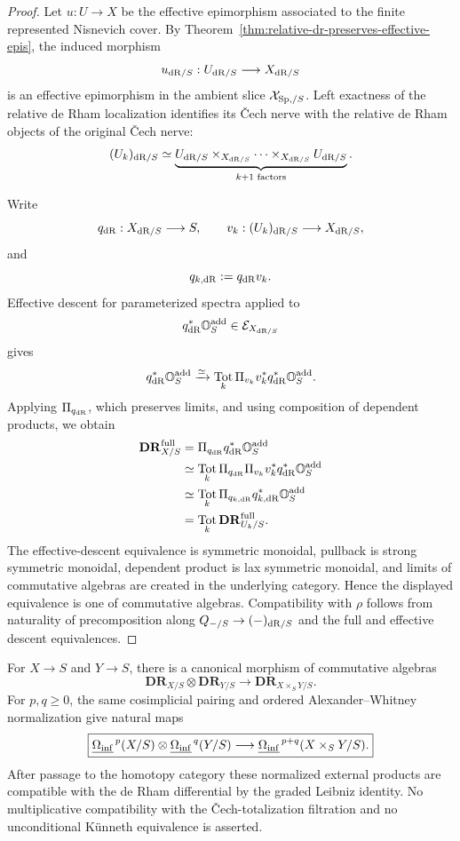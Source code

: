 \begin{proof}
Let \(u:U\to X\) be the effective epimorphism associated to the finite represented Nisnevich cover.
By Theorem~\ref{thm:relative-dr-preserves-effective-epis}, the induced morphism
\[
    u_{\mathrm{dR}/S}:
    U_{\mathrm{dR}/S}
    \longrightarrow
    X_{\mathrm{dR}/S}
\]
is an effective epimorphism in the ambient slice \(\mathcal X_{\mathrm{Sp},/S}\).  Left exactness of the
relative de Rham localization identifies its \v{C}ech nerve with the relative de Rham objects of
the original \v{C}ech nerve:
\[
    (U_k)_{\mathrm{dR}/S}
    \simeq
    \underbrace{
        U_{\mathrm{dR}/S}\times_{X_{\mathrm{dR}/S}}\cdots\times_{X_{\mathrm{dR}/S}}U_{\mathrm{dR}/S}
    }_{k+1\text{ factors}}.
\]

Write
\[
    q_{\mathrm{dR}}:X_{\mathrm{dR}/S}\longrightarrow S,
    \qquad
    v_k:(U_k)_{\mathrm{dR}/S}\longrightarrow X_{\mathrm{dR}/S},
\]
and
\[
    q_{k,\mathrm{dR}}:=q_{\mathrm{dR}}v_k.
\]
Effective descent for parameterized spectra applied to
\[
    q_{\mathrm{dR}}^*\mathbb O_S^{\mathrm{add}}
    \in
    \mathcal E_{X_{\mathrm{dR}/S}}
\]
gives
\[
    q_{\mathrm{dR}}^*\mathbb O_S^{\mathrm{add}}
    \xrightarrow{\simeq}
    \operatorname*{Tot}_k
    \Pi_{v_k}v_k^*q_{\mathrm{dR}}^*\mathbb O_S^{\mathrm{add}}.
\]
Applying \(\Pi_{q_{\mathrm{dR}}}\), which preserves limits, and using composition of dependent products,
we obtain
\[
\begin{aligned}
    \mathbf{DR}^{\mathrm{full}}_{X/S}
    &=
    \Pi_{q_{\mathrm{dR}}}q_{\mathrm{dR}}^*\mathbb O_S^{\mathrm{add}}
    \\
    &\simeq
    \operatorname*{Tot}_k
    \Pi_{q_{\mathrm{dR}}}\Pi_{v_k}v_k^*q_{\mathrm{dR}}^*\mathbb O_S^{\mathrm{add}}
    \\
    &\simeq
    \operatorname*{Tot}_k
    \Pi_{q_{k,\mathrm{dR}}}q_{k,\mathrm{dR}}^*\mathbb O_S^{\mathrm{add}}
    \\
    &=
    \operatorname*{Tot}_k
    \mathbf{DR}^{\mathrm{full}}_{U_k/S}.
\end{aligned}
\]
The effective-descent equivalence is symmetric monoidal, pullback is strong symmetric monoidal,
dependent product is lax symmetric monoidal, and limits of commutative algebras are created in the
underlying category.  Hence the displayed equivalence is one of commutative algebras.
Compatibility with \(\rho\) follows from naturality of precomposition along
\(Q_{-/S}\to(-)_{\mathrm{dR}/S}\) and the full and effective descent equivalences.
\end{proof}

\begin{proposition}
\label{prop:modal-de-rham-external-products}
For \(X\to S\) and \(Y\to S\), there is a canonical morphism of commutative algebras
\[
\boxed{
    \mathbf{DR}_{X/S}
    \otimes
    \mathbf{DR}_{Y/S}
    \longrightarrow
    \mathbf{DR}_{X\times_SY/S}.
}
\]
For \(p,q\geq0\), the same cosimplicial pairing and ordered Alexander--Whitney normalization give
natural maps
\[
\boxed{
    \underline{\Omega_{\mathrm{inf}}}^{\,p}(X/S)
    \otimes
    \underline{\Omega_{\mathrm{inf}}}^{\,q}(Y/S)
    \longrightarrow
    \underline{\Omega_{\mathrm{inf}}}^{\,p+q}(X\times_SY/S).
}
\]
After passage to the homotopy category these normalized external products are compatible with the de
Rham differential by the graded Leibniz identity.  No multiplicative compatibility with the \v{C}ech-totalization
filtration and no unconditional K\"unneth equivalence is asserted.
\end{proposition}

